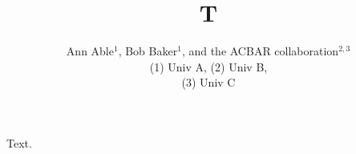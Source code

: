 \documentclass{article}
\begin{document}
\title{T}
\author{Ann Able$^{1}$, Bob Baker$^{1}$, and the
ACBAR collaboration$^{2,3}$\\ (1) Univ A, (2) Univ B,\\ (3) Univ C}
\maketitle
Text.
\end{document}
